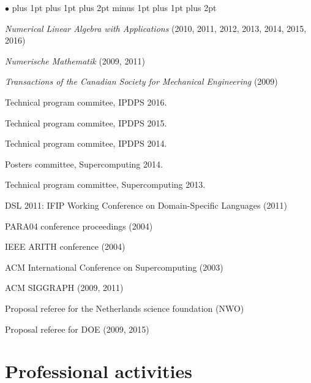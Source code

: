 \documentclass{article}
\newenvironment{icompact}{
  \begin{list}{$\bullet$}{
    \parsep 0pt plus 1pt
    \partopsep 0pt plus 1pt
    \topsep 2pt plus 2pt minus 1pt
    \itemsep 0pt plus 1pt
    \parskip 0pt plus 2pt
    \leftmargin 0.3in}
       \raggedright}
  {\normalsize\end{list}}
\begin{document}
\begin{icompact}
  \item {\em Numerical Linear Algebra with Applications} (2010, 2011,
    2012, 2013, 2014, 2015, 2016)
  \item {\em Numerische Mathematik} (2009, 2011)
  \item {\em Transactions of the Canadian Society for Mechanical
    Engineering} (2009)
  \item Technical program commitee, IPDPS 2016.
  \item Technical program commitee, IPDPS 2015.
  \item Technical program commitee, IPDPS 2014.
  \item Posters committee, Supercomputing 2014.
  \item Technical program committee, Supercomputing 2013.
  \item DSL 2011: IFIP Working Conference on Domain-Specific Languages (2011)
  \item PARA04 conference proceedings (2004)
  \item IEEE ARITH conference (2004)
  \item ACM International Conference on Supercomputing (2003)
  \item ACM SIGGRAPH (2009, 2011)
  \item Proposal referee for the Netherlands science foundation (NWO)
  \item Proposal referee for DOE (2009, 2015)
\end{icompact}


\section*{Professional activities}
\end{document}
